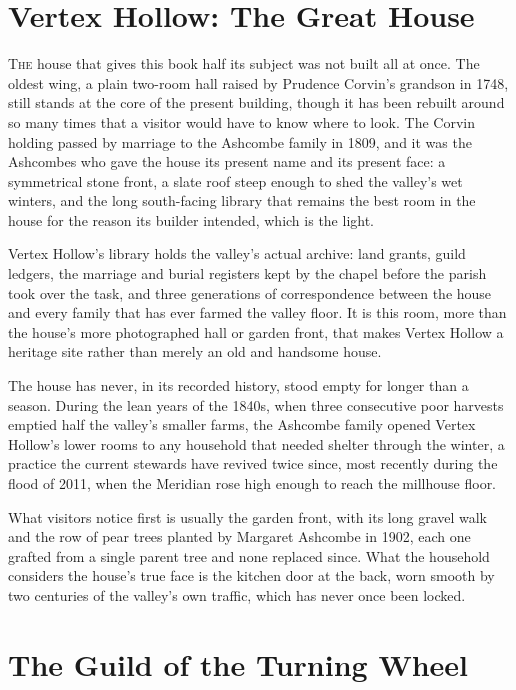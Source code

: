 \documentclass[11pt,twoside]{book}
\begin{document}
\chapter{Vertex Hollow: The Great House}

\lettrine[lines=3,loversize=0.12]{\textcolor{heritageGreen}{T}}{he} house that gives this book half its subject was not built all at once. The oldest wing, a plain two-room hall raised by Prudence Corvin's grandson in 1748, still stands at the core of the present building, though it has been rebuilt around so many times that a visitor would have to know where to look. The Corvin holding passed by marriage to the Ashcombe family in 1809, and it was the Ashcombes who gave the house its present name and its present face: a symmetrical stone front, a slate roof steep enough to shed the valley's wet winters, and the long south-facing library that remains the best room in the house for the reason its builder intended, which is the light.

Vertex Hollow's library holds the valley's actual archive: land grants, guild ledgers, the marriage and burial registers kept by the chapel before the parish took over the task, and three generations of correspondence between the house and every family that has ever farmed the valley floor. It is this room, more than the house's more photographed hall or garden front, that makes Vertex Hollow a heritage site rather than merely an old and handsome house.

The house has never, in its recorded history, stood empty for longer than a season. During the lean years of the 1840s, when three consecutive poor harvests emptied half the valley's smaller farms, the Ashcombe family opened Vertex Hollow's lower rooms to any household that needed shelter through the winter, a practice the current stewards have revived twice since, most recently during the flood of 2011, when the Meridian rose high enough to reach the millhouse floor.

What visitors notice first is usually the garden front, with its long gravel walk and the row of pear trees planted by Margaret Ashcombe in 1902, each one grafted from a single parent tree and none replaced since. What the household considers the house's true face is the kitchen door at the back, worn smooth by two centuries of the valley's own traffic, which has never once been locked.

\chapter{The Guild of the Turning Wheel}
\end{document}
